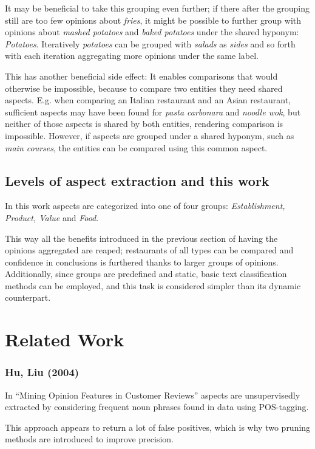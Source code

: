 \documentclass[a4paper,11pt]{kth-mag}
\begin{document}

It may be beneficial to take this grouping even further;
if there after the grouping still are too few opinions about \emph{fries},
it might be possible to further group with opinions about \emph{mashed potatoes}
and \emph{baked potatoes} under the shared hyponym: \emph{Potatoes}.
Iteratively \emph{potatoes} can be grouped with \emph{salads} as \emph{sides}
and so forth with each iteration aggregating more opinions under the same label.

This has another beneficial side effect: It enables comparisons that would otherwise
be impossible, because to compare two entities they need shared aspects.
E.g. when comparing an Italian restaurant and an Asian restaurant, sufficient aspects may
have been found for \emph{pasta carbonara} and \emph{noodle wok}, but neither of
those aspects is shared by both entities, rendering comparison is impossible.
However, if aspects are grouped under a shared hyponym, such as \emph{main courses},
the entities can be compared using this common aspect.


\subsection{Levels of aspect extraction and this work}
In this work aspects are categorized into one of four groups:
\emph{Establishment, Product, Value} and \emph{Food}.

This way all the benefits introduced in the previous section of having the opinions
aggregated are reaped; restaurants of all types can be compared and confidence in conclusions
is furthered thanks to larger groups of opinions.
Additionally, since groups are predefined and static, basic text classification methods can be employed,
and this task is considered simpler than its dynamic counterpart.


\section{Related Work}

\subsubsection{Hu, Liu (2004)}
In ``Mining Opinion Features in Customer Reviews'' aspects are unsupervisedly
extracted by considering frequent noun phrases found in data using POS-tagging.

This approach appears to return a lot of false positives, which is why two pruning
methods are introduced to improve precision.
\end{document}
